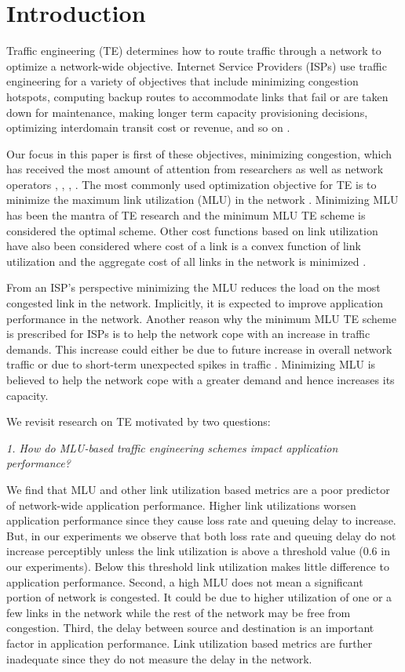 \section{Introduction}

Traffic engineering (TE) determines how to route traffic through a network to optimize a network-wide objective. Internet Service Providers (ISPs) use traffic engineering for a variety of objectives that include minimizing congestion hotspots, computing backup routes to accommodate links that fail or are taken down for maintenance, making longer term capacity provisioning decisions, optimizing interdomain transit cost or revenue, and so on \cite{rexford}.

Our focus in this paper is first of these objectives, minimizing congestion, which has received the most amount of attention from researchers as well as network operators \cite{COPE1}, \cite{TeXCP06}, \cite{FortzThorup}, \cite{ObliviousRouting}. The most commonly used optimization objective for TE is to minimize the maximum link utilization (MLU) in the network \cite{COPE1,TeXCP06,MultiTM,ObliviousRouting}. Minimizing MLU has been the mantra of TE research and the minimum MLU TE scheme is considered the optimal scheme.  Other cost functions based on link utilization have also been considered where cost of a link is a convex function of link utilization and the aggregate cost of all links in the network is minimized \cite{MATE1,FortzThorup}.

From an ISP's perspective minimizing the MLU reduces the load on the most congested link in the network. Implicitly, it is expected to improve application performance in the network. Another reason why the minimum MLU  TE scheme is prescribed for ISPs is to help the network cope with an increase in traffic demands. This increase could either be due to future increase in overall network traffic \cite{TeXCP06} or due to short-term unexpected spikes in traffic \cite{COPE1}. Minimizing MLU is believed to help the network cope with a greater demand and hence increases its capacity.

We revisit research on TE  motivated by two questions:

\emph{ 1. How do MLU-based traffic engineering schemes impact application performance?}

We find that MLU and other link utilization based metrics are a poor predictor of network-wide application performance.  Higher link utilizations worsen application performance since they cause loss rate and queuing delay to increase. But, in our experiments we observe that both  loss rate and queuing delay do not increase perceptibly unless the link utilization is above a threshold value (0.6 in our experiments). Below this threshold link utilization makes little difference to application performance. Second, a high MLU does not mean a significant portion of network is congested. It could be due to higher utilization of one or a few links in the network while the rest of the network may be free from congestion. Third, the delay between source and destination is an important factor in application performance. Link utilization based metrics are further inadequate since they do not measure the delay in the network.


